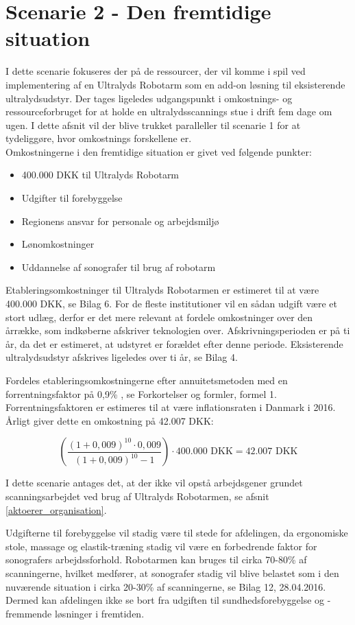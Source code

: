 \section{Scenarie 2 - Den fremtidige situation} \label{fremtidige}
I dette scenarie fokuseres der på de ressourcer, der vil komme i spil ved implementering af en Ultralyds Robotarm som en add-on løsning til eksisterende ultralydsudstyr. Der tages ligeledes udgangspunkt i omkostnings- og ressourceforbruget for at holde en ultralydsscannings stue i drift fem dage om ugen. I dette afsnit vil der blive trukket paralleller til scenarie 1 for at tydeliggøre, hvor omkostnings forskellene er. \\
Omkostningerne i den fremtidige situation er givet ved følgende punkter:
\begin{itemize}
\item 400.000 DKK til Ultralyds Robotarm
\item Udgifter til forebyggelse
\item Regionens ansvar for personale og arbejdsmiljø
\item Lønomkostninger
\item Uddannelse af sonografer til brug af robotarm
\end{itemize}
Etableringsomkostninger til Ultralyds Robotarmen er estimeret til at være 400.000 DKK, se Bilag 6.
For de fleste institutioner vil en sådan udgift være et stort udlæg, derfor er det mere relevant at fordele omkostninger over den årrække, som indkøberne afskriver teknologien over. Afskrivningsperioden er på ti år, da det er estimeret, at udstyret er forældet efter denne periode. Eksisterende ultralydsudstyr afskrives ligeledes over ti år, se Bilag 4.

Fordeles etableringsomkostningerne efter annuitetsmetoden med en forrentningsfaktor på 0,9\% \cite{Inflationsrate}, se Forkortelser og formler, formel 1. Forrentningsfaktoren er estimeres til at være inflationsraten i Danmark i 2016. Årligt giver dette en omkostning på 42.007 DKK:

\begin{equation}
\left(\frac{(1+0,009)^{10}\cdot0,009}{(1+0,009)^{10}-1}\right)\cdot400.000 \text{ DKK}=42.007 \text{ DKK}
\end{equation}

I dette scenarie antages det, at der ikke vil opstå arbejdsgener grundet scanningsarbejdet ved brug af Ultralyds Robotarmen, se afsnit \ref{aktoerer_organisation}. 

Udgifterne til forebyggelse vil stadig være til stede for afdelingen, da ergonomiske stole, massage og elastik-træning stadig vil være en forbedrende faktor for sonografers arbejdssforhold. Robotarmen kan bruges til cirka 70-80\% af scanningerne, hvilket medfører, at sonografer stadig vil blive belastet som i den nuværende situation i cirka 20-30\% af scanningerne, se Bilag 12, 28.04.2016. Dermed kan afdelingen ikke se bort fra udgiften til sundhedsforebyggelse og -fremmende løsninger i fremtiden.  

